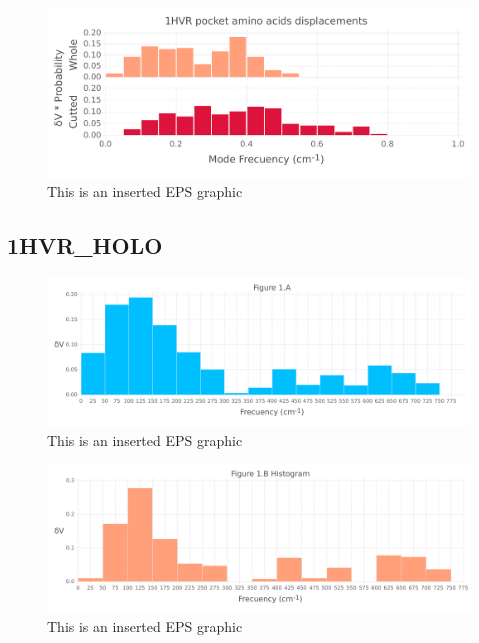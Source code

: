 \documentclass[10pt,letterpaper]{article}
\begin{document}
\begin{figure}[ht]
\begin{center}
\includegraphics[scale=0.5]{1hvr_apo/3both_figure_very_hi-precision.pdf}
\caption{This is an inserted EPS graphic}
\label{fig13}
\end{center}
\end{figure}

\FloatBarrier
\newpage

\subsection{1HVR\_HOLO}

\begin{figure}[ht]
\begin{center}
\includegraphics[scale=0.5]{1hvr_hol/1afigure_very_hi-precision.pdf}
\caption{This is an inserted EPS graphic}
\label{fig1}
\end{center}
\end{figure}

\begin{figure}[ht]
\begin{center}
\includegraphics[scale=0.5]{1hvr_hol/1bfigure_very_hi-precision.pdf}
\caption{This is an inserted EPS graphic}
\label{fig2}
\end{center}
\end{figure}
\end{document}
